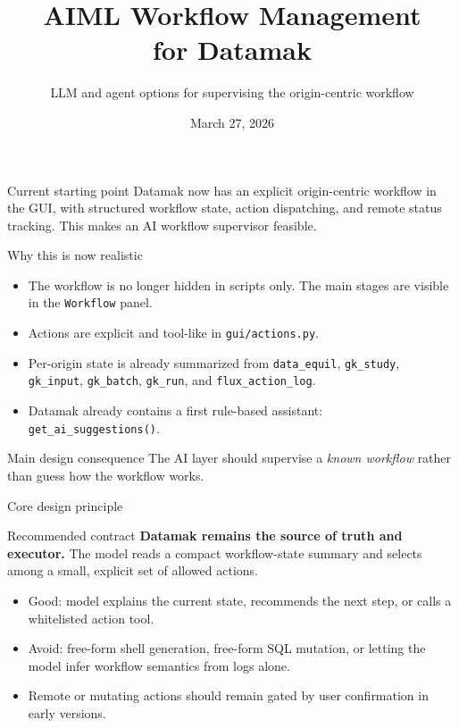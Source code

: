 \documentclass[aspectratio=169,11pt]{beamer}
\title[AIML Workflow Management]{AIML Workflow Management\\for Datamak}
\subtitle{LLM and agent options for supervising the origin-centric workflow}
\author{}
\date[Mar 27, 2026]{March 27, 2026}
\newcommand{\code}[1]{\texttt{#1}}
\newcommand{\good}[1]{\textcolor{ppplGreen}{#1}}
\newcommand{\warn}[1]{\textcolor{ppplOrange}{#1}}
\begin{document}
\begin{frame}[plain]
  \titlepage
  \vspace{-0.8em}
  \begin{block}{Current starting point}
    Datamak now has an explicit origin-centric workflow in the GUI, with
    structured workflow state, action dispatching, and remote status tracking.
    This makes an AI workflow supervisor feasible.
  \end{block}
\end{frame}

\begin{frame}{Why this is now realistic}
  \begin{itemize}
    \item The workflow is no longer hidden in scripts only. The main stages are
    visible in the \code{Workflow} panel.
    \item Actions are explicit and tool-like in \code{gui/actions.py}.
    \item Per-origin state is already summarized from
    \code{data\_equil}, \code{gk\_study}, \code{gk\_input},
    \code{gk\_batch}, \code{gk\_run}, and \code{flux\_action\_log}.
    \item Datamak already contains a first rule-based assistant:
    \code{get\_ai\_suggestions()}.
  \end{itemize}

  \vspace{0.4em}
  \begin{block}{Main design consequence}
    The AI layer should supervise a \emph{known workflow} rather than guess how
    the workflow works.
  \end{block}
\end{frame}

\begin{frame}{Core design principle}
  \begin{block}{Recommended contract}
    \textbf{Datamak remains the source of truth and executor.} The model reads a
    compact workflow-state summary and selects among a small, explicit set of
    allowed actions.
  \end{block}

  \begin{itemize}
    \item \good{Good:} model explains the current state, recommends the next
    step, or calls a whitelisted action tool.
    \item \warn{Avoid:} free-form shell generation, free-form SQL mutation, or
    letting the model infer workflow semantics from logs alone.
    \item Remote or mutating actions should remain gated by user confirmation in
    early versions.
  \end{itemize}
\end{frame}
\end{document}
